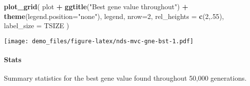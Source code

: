 \documentclass[]{book}
\newenvironment{Shaded}{\begin{snugshade}}{\end{snugshade}}
\newcommand{\DataTypeTok}[1]{\textcolor[rgb]{0.13,0.29,0.53}{#1}}
\newcommand{\DecValTok}[1]{\textcolor[rgb]{0.00,0.00,0.81}{#1}}
\newcommand{\FloatTok}[1]{\textcolor[rgb]{0.00,0.00,0.81}{#1}}
\newcommand{\KeywordTok}[1]{\textcolor[rgb]{0.13,0.29,0.53}{\textbf{#1}}}
\newcommand{\NormalTok}[1]{#1}
\newcommand{\OperatorTok}[1]{\textcolor[rgb]{0.81,0.36,0.00}{\textbf{#1}}}
\newcommand{\OtherTok}[1]{\textcolor[rgb]{0.56,0.35,0.01}{#1}}
\newcommand{\StringTok}[1]{\textcolor[rgb]{0.31,0.60,0.02}{#1}}
\let\oldparagraph\paragraph
\renewcommand{\paragraph}[1]{\oldparagraph{#1}\mbox{}}
\begin{document}
\begin{Shaded}
\begin{Highlighting}[]
\KeywordTok{plot_grid}\NormalTok{(}
\NormalTok{  plot }\OperatorTok{+}
\StringTok{    }\KeywordTok{ggtitle}\NormalTok{(}\StringTok{"Best gene value throughout"}\NormalTok{) }\OperatorTok{+}
\StringTok{    }\KeywordTok{theme}\NormalTok{(}\DataTypeTok{legend.position=}\StringTok{"none"}\NormalTok{),}
\NormalTok{  legend,}
  \DataTypeTok{nrow=}\DecValTok{2}\NormalTok{,}
  \DataTypeTok{rel_heights =} \KeywordTok{c}\NormalTok{(}\DecValTok{2}\NormalTok{,.}\DecValTok{55}\NormalTok{),}
  \DataTypeTok{label_size =}\NormalTok{ TSIZE}
\NormalTok{)}
\end{Highlighting}
\end{Shaded}

\texttt{[image: demo\_files/figure-latex/nds-mvc-gne-bst-1.pdf]}

\hypertarget{stats-75}{%
\paragraph{Stats}\label{stats-75}}

Summary statistics for the best gene value found throughout 50,000 generations.

\begin{Shaded}
\end{Shaded}
\end{document}
